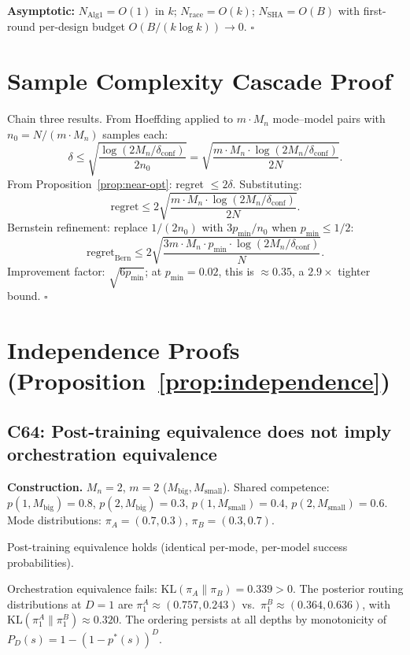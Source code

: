 \documentclass[11pt]{article}
\newcommand{\KL}{\mathrm{KL}}
\newcommand{\Mn}{M_n}
\newcommand{\pmin}{p_{\min}}
\newcommand{\dconf}{\delta_{\mathrm{conf}}}
\newcommand{\qed}{\hfill\(\square\)}
\begin{document}
\textbf{Asymptotic:}
$N_{\mathrm{Alg1}} = O(1)$ in $k$;
$N_{\mathrm{race}} = O(k)$;
$N_{\mathrm{SHA}} = O(B)$ with first-round per-design budget
$O(B/(k\log k)) \to 0$. \qed

\section{Sample Complexity Cascade Proof}
\label{app:cascade}

Chain three results.  From Hoeffding applied to $m \cdot \Mn$ mode--model
pairs with $n_0 = N/(m \cdot \Mn)$ samples each:
\[
  \delta \le \sqrt{\frac{\log(2\Mn/\dconf)}{2n_0}}
  = \sqrt{\frac{m \cdot \Mn \cdot \log(2\Mn/\dconf)}{2N}}.
\]
From Proposition~\ref{prop:near-opt}: regret $\le 2\delta$.
Substituting:
\[
  \text{regret} \le 2\sqrt{\frac{m \cdot \Mn \cdot \log(2\Mn/\dconf)}{2N}}.
\]
Bernstein refinement: replace $1/(2n_0)$ with
$3\pmin/n_0$ when $\pmin \le 1/2$:
\[
  \text{regret}_{\mathrm{Bern}} \le
  2\sqrt{\frac{3m \cdot \Mn \cdot \pmin \cdot \log(2\Mn/\dconf)}{N}}.
\]
Improvement factor: $\sqrt{6\pmin}$; at $\pmin = 0.02$, this is
$\approx 0.35$, a $2.9\times$ tighter bound. \qed

\section{Independence Proofs (Proposition~\ref{prop:independence})}
\label{app:independence}

\subsection{C64: Post-training equivalence does not imply orchestration equivalence}

\textbf{Construction.}
$\Mn{=}2$, $m{=}2$ ($M_{\mathrm{big}}, M_{\mathrm{small}}$).
Shared competence:
$p(1, M_{\mathrm{big}}) = 0.8$, $p(2, M_{\mathrm{big}}) = 0.3$,
$p(1, M_{\mathrm{small}}) = 0.4$, $p(2, M_{\mathrm{small}}) = 0.6$.
Mode distributions: $\pi_A = (0.7, 0.3)$, $\pi_B = (0.3, 0.7)$.

Post-training equivalence holds (identical per-mode, per-model success
probabilities).

Orchestration equivalence fails: $\KL(\pi_A \| \pi_B) = 0.339 > 0$.
The posterior routing distributions at $D{=}1$ are
$\pi_1^A \approx (0.757, 0.243)$ vs.\
$\pi_1^B \approx (0.364, 0.636)$,
with $\KL(\pi_1^A \| \pi_1^B) \approx 0.320$.
The ordering persists at all depths by monotonicity of
$P_D(s) = 1 - (1-p^*(s))^D$.
\end{document}
